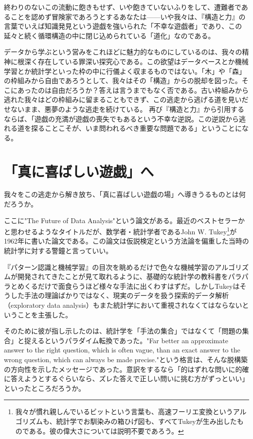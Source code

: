 終わりのないこの流動に飽きもせず、いや飽きていないふりをして、遭難者であることを認めず冒険家であろうとするあなたは------いや我々は、『構造と力』の言葉でいえば知識発見という遊戯を強いられた「不幸な遊戯者」であり、この延々と続く循環構造の中に閉じ込められている「道化」なのである。

データから学ぶという営みをこれほどに魅力的なものにしているのは、我々の精神に根深く存在している罪深い探究心である。この欲望はデータベースとか機械学習とか統計学といった枠の中に行儀よく収まるものではない。「木」や「森」の枠組みから自由であろうとして、我々はその「構造」からの脱却を図った。そこにあったのは自由だろうか？答えは言うまでもなく否である。古い枠組みから逃れた我々はどの枠組みに留まることもできず、この逃走から逃げる道を見いだせないまま、悪夢のような逃走を続けている。
再び『構造と力』から引用するならば、「遊戯の充満が遊戯の喪失でもあるという不幸な逆説。この逆説から逃れる道を探ることこそが、いま問われるべき重要な問題である」ということになる。

\section{「真に喜ばしい遊戯」へ}
我々をこの逃走から解き放ち、「真に喜ばしい遊戯の場」へ導きうるものとは何だろうか。

ここに"The Future of Data Analysis"という論文がある。最近のベストセラーかと思わせるようなタイトルだが、数学者・統計学者であるJohn W. Tukey\footnote{我々が慣れ親しんでいるビットという言葉も、高速フーリエ変換というアルゴリズムも、統計学でお馴染みの箱ひげ図も、すべてTukeyが生み出したものである。彼の偉大さについては説明不要であろう。}が1962年に書いた論文である。この論文は仮説検定という方法論を偏重した当時の統計学に対する警鐘と言っていい。

『パターン認識と機械学習』の目次を眺めるだけで色々な機械学習のアルゴリズムが開発されてきたことが見て取れるように、基礎的な統計学の教科書をパラパラとめくるだけで面食らうほど様々な手法に出くわすはずだ。しかしTukeyはそうした手法の理論ばかりではなく、現実のデータを扱う探索的データ解析（exploratory data analysis）もまた統計学において重視されなくてはならないということを主張した。

そのために彼が指し示したのは、統計学を「手法の集合」ではなくて「問題の集合」と捉えるというパラダイム転換であった。"Far better an approximate answer to the right question, which is often vague, than an exact answer to the wrong question, which can always be made precise."という格言は、そんな脱構築の方向性を示したメッセージであった。意訳をするなら「的はずれな問いに的確に答えようとするぐらいなら、ズレた答えで正しい問いに挑む方がずっといい」といったところだろうか。


